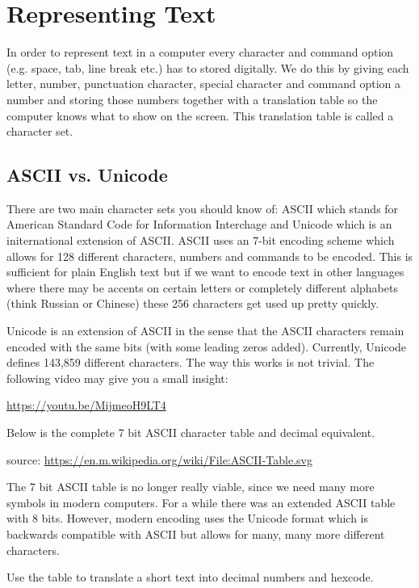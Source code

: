\documentclass[11pt,a4paper]{report}
\begin{document}
\newpage

\section{Representing Text}

In order to represent text in a computer every character and command option (e.g. space, tab, line break etc.) has to stored digitally. We do this by giving each letter, number, punctuation character, special character and command option a number and storing those numbers together with a translation table so the computer knows what to show on the screen. This translation table is called a character set.

\subsection{ASCII vs. Unicode}

There are two main character sets you should know of: ASCII which stands for American Standard Code for Information Interchage and Unicode which is an initernational extension of ASCII. ASCII uses an 7-bit encoding scheme which allows for 128 different characters, numbers and commands to be encoded. This is sufficient for plain English text but if we want to encode text in other languages where there may be accents on certain letters or completely different alphabets (think Russian or Chinese) these 256 characters get used up pretty quickly.

Unicode is an extension of ASCII in the sense that the ASCII characters remain encoded with the same bits (with some leading zeros added). Currently, Unicode defines 143,859 different characters. The way this works is not trivial. The following video may give you a small insight:

\url{https://youtu.be/MijmeoH9LT4}

Below is the complete 7 bit ASCII character table and decimal equivalent.

\hfill source: {\url{https://en.m.wikipedia.org/wiki/File:ASCII-Table.svg}}

The 7 bit ASCII table is no longer really viable, since we need many more symbols in modern computers. For a while there was an extended ASCII table with 8 bits. However, modern encoding uses the Unicode format which is backwards compatible with ASCII but allows for many, many more different characters.

\begin{ex}
Use the table to translate a short text into decimal numbers and hexcode.
\end{ex}
\end{document}
